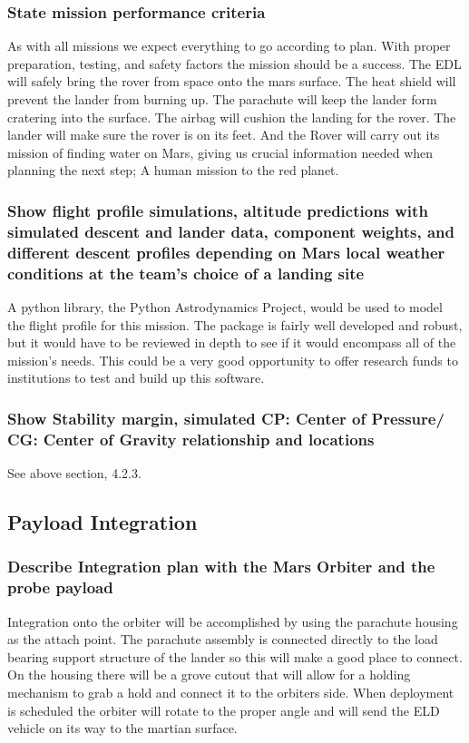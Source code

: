\documentclass[%
 portrait,
 aapm,
 mph,%
 amsmath,amssymb,
 reprint,%
]{revtex4-2}
\begin{document}
\subsubsection{State mission performance criteria}
As with all missions we expect everything to go according to plan.  With proper preparation, testing, and safety factors the mission should be a success.  The EDL will safely bring the rover from space onto the mars surface.  The heat shield will prevent the lander from burning up.  The parachute will keep the lander form cratering into the surface.  The airbag will cushion the landing for the rover.  The lander will make sure the rover is on its feet.  And the Rover will carry out its mission of finding water on Mars, giving us crucial information needed when planning the next step; A human mission to the red planet. 


\subsubsection{Show flight profile simulations, altitude predictions with simulated descent and lander data, component weights, and different descent profiles depending on Mars local weather conditions at the team’s choice of a landing site}
A python library, the Python Astrodynamics Project, would be used to model the flight profile for this mission. The package is fairly well developed and robust, but it would have to be reviewed in depth to see if it would encompass all of the mission's needs. This could be a very good opportunity to offer research funds to institutions to test and build up this software. 

\subsubsection{Show Stability margin, simulated CP: Center of Pressure/ CG: Center of Gravity relationship and locations}
See above section, 4.2.3.

\subsection{Payload Integration}

\subsubsection{Describe Integration plan with the Mars Orbiter and the probe payload}
Integration onto the orbiter will be accomplished by using the parachute housing as the attach point.  The parachute assembly is connected directly to the load bearing support structure of the lander so this will make a good place to connect.  On the housing there will be a grove cutout that will allow for a holding mechanism to grab a hold and connect it to the orbiters side.  When deployment is scheduled the orbiter will rotate to the proper angle and will send the ELD vehicle on its way to the martian surface.
\end{document}

